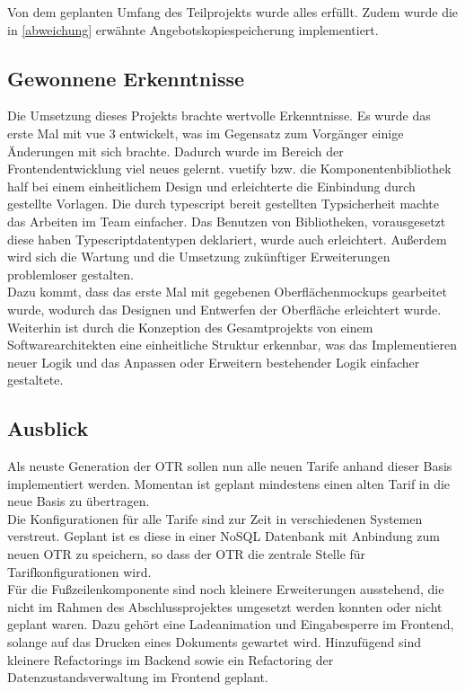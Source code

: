  Von dem geplanten Umfang des Teilprojekts wurde alles erfüllt. Zudem wurde die in \ref{abweichung}  erwähnte Angebotskopiespeicherung implementiert.
\subsection{Gewonnene Erkenntnisse}
\label{erkenntnisse}
Die Umsetzung dieses Projekts brachte wertvolle Erkenntnisse. Es wurde das erste Mal mit \gls{vue} 3 entwickelt, was im Gegensatz zum Vorgänger einige Änderungen mit sich brachte. Dadurch wurde im Bereich der Frontendentwicklung viel neues gelernt. \gls{vuetify} bzw. die Komponentenbibliothek half bei einem einheitlichem Design und erleichterte die Einbindung durch gestellte Vorlagen. Die durch \gls{typescript} bereit gestellten Typsicherheit machte das Arbeiten im Team einfacher. Das Benutzen von Bibliotheken, vorausgesetzt diese haben Typescriptdatentypen deklariert, wurde auch erleichtert. Außerdem wird sich die Wartung und die Umsetzung zukünftiger Erweiterungen problemloser gestalten.\\ 
Dazu kommt, dass das erste Mal mit gegebenen Oberflächenmockups gearbeitet wurde, wodurch das Designen und Entwerfen der Oberfläche erleichtert wurde. Weiterhin ist durch die Konzeption des Gesamtprojekts von einem Softwarearchitekten eine einheitliche Struktur erkennbar, was das Implementieren neuer Logik und das Anpassen oder Erweitern bestehender Logik einfacher gestaltete.
\subsection{Ausblick}
\label{ausblick}
Als neuste Generation der \ac{OTR} sollen nun alle neuen Tarife anhand dieser Basis implementiert werden. Momentan ist geplant mindestens einen alten Tarif in die neue Basis zu übertragen.\\
Die Konfigurationen für alle Tarife sind zur Zeit in verschiedenen Systemen verstreut. Geplant ist es diese in einer NoSQL Datenbank mit Anbindung zum neuen \ac{OTR} zu speichern, so dass der \ac{OTR} die zentrale Stelle für Tarifkonfigurationen wird.\\
Für die Fußzeilenkomponente sind noch kleinere Erweiterungen ausstehend, die nicht im Rahmen des Abschlussprojektes umgesetzt werden konnten oder nicht geplant waren. Dazu gehört eine Ladeanimation und Eingabesperre im Frontend, solange auf das Drucken eines Dokuments gewartet wird. Hinzufügend sind kleinere Refactorings im Backend sowie ein Refactoring der Datenzustandsverwaltung im Frontend geplant.